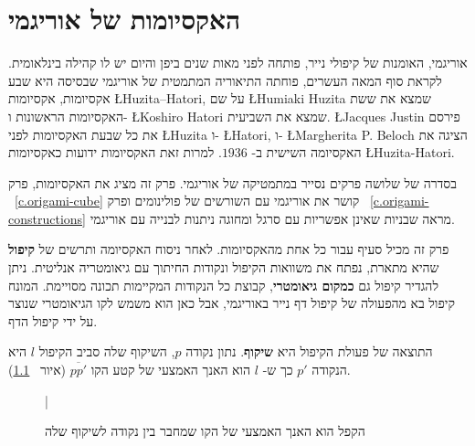 


\chapter{האקסיומות של אוריגמי}\label{c.origami-axioms}

אוריגמי, האומנות של קיפולי נייר, פותחה לפני מאות שנים ביפן והיום יש לו קהילה בינלאומית. לקראת סוף המאה העשרים, פוחתה התיאוריה המתמטית של אוריגמי שבסיסה היא שבע אקסיומות, אקסיומות
\L{Huzita–Hatori},
על שם
\L{Humiaki Huzita}
שמצא את ששת האקסיומות הראשונות ו-%
\L{Koshiro Hatori}
שמצא את השביעית.
\L{Jacques Justin}
פירסם את כל שבעת האקסיומות לפני
\L{Huzita}
ו-%
\L{Hatori},
ו-%
\L{Margherita P. Beloch}
הציגה את האקסיומה השישית ב-%
$1936$.
למרות זאת האקסיומות ידועות כאקסיומות
\L{Huzita-Hatori}.

בסדרה של שלושה פרקים נסייר במתמטיקה של אוריגמי. פרק זה מציג את האקסיומות, פרק%
~\ref{c.origami-cube}
קושר את אוריגמי עם השורשים של פולינומים ופרק%
~\ref{c.origami-constructions} 
מראה שבניות שאינן אפשריות עם סרגל ומחוגה ניתנות לבנייה עם אוריגמי.
 
פרק זה מכיל סעיף עבור כל אחת מהאקסיומות. לאחר ניסוח האקסיומה ותרשים של 
\textbf{קיפול}
שהיא מתארת, נפתח את משוואות הקיפול ונקודות החיתוך עם גיאומטריה אנליטית. ניתן להגדיר קיפול גם 
\textbf{כמקום גיאומטרי},
קבוצת כל הנקודות המקיימות תכונה מסויימת. המונח קיפול בא מהפעולה של קיפול דף נייר באוריגמי, אבל כאן הוא משמש לקו הגיאומטרי שנוצר על ידי קיפול הדף.

התוצאה של פעולת הקיפול היא
\textbf{שיקוף}.
נתון נקודה
$p$,
השיקוף שלה סביב הקיפול
$l$
היא הנקודה 
$p'$
כך ש-%
$l$
הוא האנך האמצעי של קטע הקו
$\overline{pp'}$
(איור%
~\ref{f.origami-def}).
\begin{figure}[htb]
\begin{center}
|
\caption{הקפל הוא האנך האמצעי של הקו שמחבר בין נקודה לשיקוף שלה}
\label{f.origami-def}
\end{center}
\end{figure}

